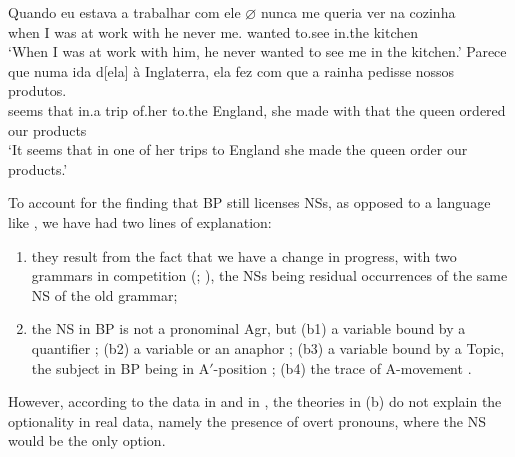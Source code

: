 \documentclass[output=paper]{langsci/langscibook}
\begin{document}
\begin{enumerate}[label=(\alph*)]
\ea%
    \label{ex:26.21}
    \ea
	\gll	Quando eu estava a trabalhar com ele \textbf{$\varnothing$} nunca me     queria ver na cozinha\\
            when     I   was     at work       with he {} never  me.\Cl{} wanted to.see in.the kitchen\\
	\glt	\enquote*{When I was at work with him, he never wanted to see me in the kitchen.}
    \ex
	\gll	Parece que numa ida d[ela]     à   Inglaterra, ela fez     com que   a rainha pedisse nossos produtos.\\
			seems   that in.a   trip of.her to.the England,    she made with that  the queen ordered our products\\
	\glt	\enquote*{It seems that in one of her trips to England she made the queen order our products.}
    \z
\z
\end{enumerate}

To account for the finding that \gls{BP} still
licenses NSs, as opposed to a language like , we have had two
lines of explanation:

\begin{enumerate}[label=(\alph*)]
\item they result from the fact that we have a change in progress,
with two grammars in competition (\citealt{Duarte1993,Duarte1995};
\citealt{Kato2000}), the NSs being residual occurrences of the  same NS of the
old grammar;

\item the NS in \gls{BP} is not a
pronominal Agr,  but (b1) a variable bound by a quantifier
\parencite{NegraoMuller1996}; (b2) a variable or an anaphor
\parencite{FigueiredoSilva2000}; (b3) a variable bound by a Topic, the subject
in \gls{BP} being in A$'$-position \citep{Modesto2000};
(b4) the trace of A-movement
\parencite{Ferreira2004,Rodrigues2004,MartinsNunes2009}.
\end{enumerate}

However, according to the data in \textcite{BarbosaDuarteKato2005} and in
\citet{Kato2009}, the theories in (b) do not explain the optionality in real
data, namely the presence of overt pronouns, where the NS would be the only
option.
\end{document}

